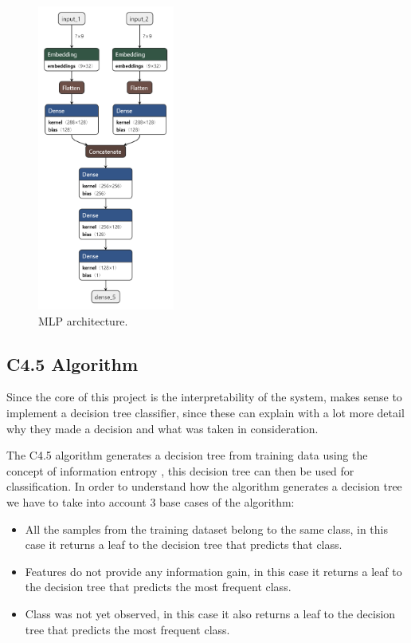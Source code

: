 \documentclass[12pt,a4paper,oneside]{memoir}
\begin{document}
\par





\begin{figure}[H]
\centering
\includegraphics[width=0.4\textwidth]{images/mlp_model.png}
\caption{\acs{MLP} architecture.}
\centering
\label{fig:mlparch}
\end{figure}



\subsection{C4.5 Algorithm}
\label{sec:alg45}
Since the core of this project is the interpretability of the system, makes sense to implement a decision tree classifier, since these can explain with a lot more detail why they made a decision and what was taken in consideration.

\par

The C4.5 algorithm generates a decision tree from training data using the concept of information entropy \cite{entropy}, this decision tree can then be used for classification. In order to understand how the algorithm generates a decision tree we have to take into account 3 base cases of the algorithm:
\begin{itemize}
    \item All the samples from the training dataset belong to the same class, in this case it returns a leaf to the decision tree that predicts that class.
    \item Features do not provide any information gain, in this case it returns a leaf to the decision tree that predicts the most frequent class.
    \item Class was not yet observed, in this case it also returns a leaf to the decision tree that predicts the most frequent class.
\end{itemize}
\end{document}
